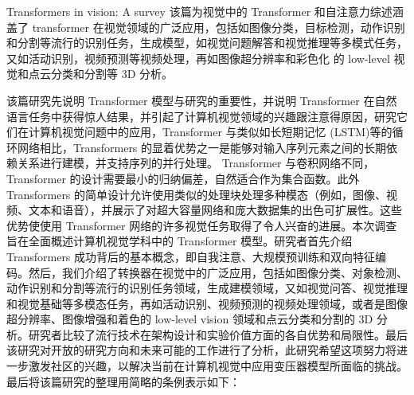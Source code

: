 Transformers in vision: A survey 该篇为视觉中的 Transformer 和自注意力综述涵盖了 transformer 在视觉领域的广泛应用，包括如图像分类，目标检测，动作识别和分割等流行的识别任务，生成模型，如视觉问题解答和视觉推理等多模式任务，又如活动识别，视频预测等视频处理，再如图像超分辨率和彩色化 的 low-level 视觉和点云分类和分割等 3D 分析。

该篇研究先说明 Transformer 模型与研究的重要性，并说明  Transformer 在自然语言任务中获得惊人结果，并引起了计算机视觉领域的兴趣跟注意得原因，研究它们在计算机视觉问题中的应用，Transformer 与类似如长短期记忆 (LSTM)等的循环网络相比，Transformers 的显着优势之一是能够对输入序列元素之间的长期依赖关系进行建模，并支持序列的并行处理。 Transformer 与卷积网络不同，Transformer 的设计需要最小的归纳偏差，自然适合作为集合函数。此外 Transformers 的简单设计允许使用类似的处理块处理多种模态（例如，图像、视频、文本和语音），并展示了对超大容量网络和庞大数据集的出色可扩展性。这些优势使使用 Transformer 网络的许多视觉任务取得了令人兴奋的进展。本次调查旨在全面概述计算机视觉学科中的 Transformer 模型。研究者首先介绍 Transformers 成功背后的基本概念，即自我注意、大规模预训练和双向特征编码。然后，我们介绍了转换器在视觉中的广泛应用，包括如图像分类、对象检测、动作识别和分割等流行的识别任务领域，生成建模领域，又如视觉问答、视觉推理和视觉基础等多模态任务，再如活动识别、视频预测的视频处理领域，或者是图像超分辨率、图像增强和着色的 low-level vision 领域和点云分类和分割的 3D 分析。研究者比较了流行技术在架构设计和实验价值方面的各自优势和局限性。最后该研究对开放的研究方向和未来可能的工作进行了分析，此研究希望这项努力将进一步激发社区的兴趣，以解决当前在计算机视觉中应用变压器模型所面临的挑战。最后将该篇研究的整理用简略的条例表示如下：
